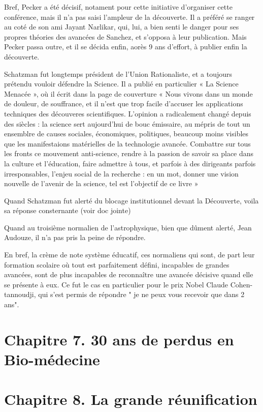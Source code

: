 \documentclass[a4paper,12pt]{article}
\begin{document}
Bref, Pecker a été décisif, notament pour cette initiative d'organiser cette conférence, mais il n’a pas saisi l’ampleur de la découverte. Il a préféré se ranger au coté de son ami Jayant Narlikar, qui, lui, a bien senti le danger pour ses propres théories des avancées de Sanchez, et s'opposa à leur publication. Mais Pecker passa outre, et il se décida enfin, aorès 9 ans d'effort, à publier enfin la découverte.

    Schatzman fut longtemps président de l’Union Rationaliste, et a toujours prétendu vouloir défendre la Science. Il a publié en particulier « La Science Menacée », où il écrit dans la page de couverture  « Nous vivons dans un monde de douleur, de souffrance, et il n’est que trop facile d’accuser les applications techniques des découveres scientifiques. L’opinion a radicalement changé depuis des siècles : la science sert aujourd’hui de bouc émissaire, au mépris de tout un ensemblre de causes sociales, économiques, politiques, beaucoup moins visibles que les manifestaions matérielles de la technologie avancée. Combattre sur tous les fronts ce mouvement anti-science, rendre à la passion de savoir sa place dans la culture et l’éducation, faire admettre à tous, et parfois à des dirigeants parfois irresponsables, l’enjeu social de  la recherche : en un mot, donner une vision nouvelle de l’avenir de la science, tel est l’objectif de ce livre »

 Quand Schatzman fut alerté du blocage institutionnel devant la Découverte, voila sa réponse consternante  (voir doc jointe) 

Quand au troisième normalien de l’astrophysique, bien que dûment alerté, Jean Audouze, il n’a pas pris la peine de répondre.

En bref, la crème de note système éducatif, ces normaliens qui sont, de part leur formation scolaire où tout est parfaitement défini, incapables de grandes avancées, sont de plus incapables de reconna\^itre une avancée décisive quand elle se présente à eux. Ce fut le cas en particulier pour le prix Nobel Claude Cohen-tannoudji, qui s'est permis de répondre " je ne peux vous recevoir que dans 2 ans".


 
\section{Chapitre 7. 30 ans de perdus en Bio-médecine}

\section{Chapitre 8. La grande réunification}
\end{document}
